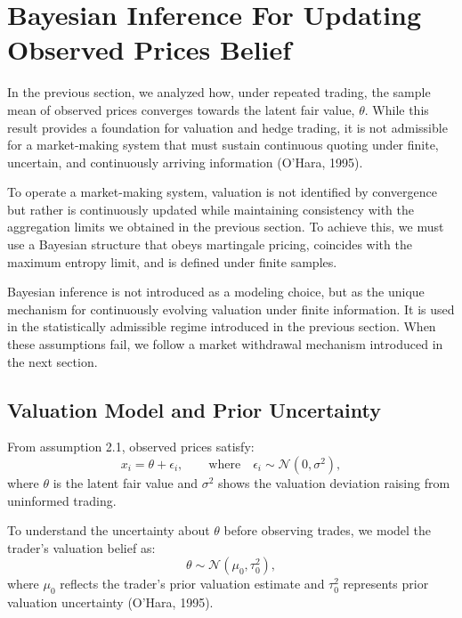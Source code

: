 \documentclass[12pt]{article}
\theoremstyle{plain}
\theoremstyle{definition}
\numberwithin{equation}{section}
\begin{document}
\section{Bayesian Inference For Updating Observed Prices Belief}
In the previous section, we analyzed how, under repeated trading, the sample mean of observed prices converges towards the latent fair value, $\theta$. While this result provides a foundation for valuation and hedge trading, it is not admissible for a market-making system that must sustain continuous quoting under finite, uncertain, and continuously arriving information (O'Hara, 1995). 

To operate a market-making system, valuation is not identified by convergence but rather is continuously updated while maintaining consistency with the aggregation limits we obtained in the previous section. To achieve this, we must use a Bayesian structure that obeys martingale pricing, coincides with the maximum entropy limit, and is defined under finite samples. 

Bayesian inference is not introduced as a modeling choice, but as the unique mechanism for continuously evolving valuation under finite information. It is used in the statistically admissible regime introduced in the previous section. When these assumptions fail, we follow a market withdrawal mechanism introduced in the next section.

\subsection{Valuation Model and Prior Uncertainty}
From assumption 2.1, observed prices satisfy:
\begin{equation}
x_i = \theta + \epsilon_i, \qquad  \text{where}  \quad \epsilon_i \sim \mathcal{N}(0,\sigma^2),
\end{equation}
where $\theta $ is the latent fair value and $\sigma^2$ shows the valuation deviation raising from uninformed trading.

To understand the uncertainty about $\theta$ before observing trades, we model the trader's valuation belief as:
\begin{equation}
\theta \sim \mathcal{N}(\mu_0,\tau_0^2),
\end{equation}
where $\mu_0$ reflects the trader’s prior valuation estimate and $\tau_0^2$ represents prior valuation uncertainty (O'Hara, 1995).
\end{document}
